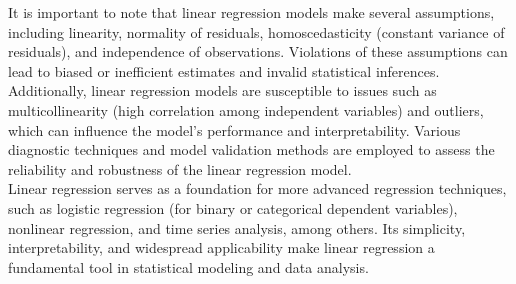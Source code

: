 It is important to note that linear regression models make several assumptions, including linearity, normality of residuals, homoscedasticity (constant variance of residuals), and independence of observations. Violations of these assumptions can lead to biased or inefficient estimates and invalid statistical inferences.\\

Additionally, linear regression models are susceptible to issues such as multicollinearity (high correlation among independent variables) and outliers, which can influence the model's performance and interpretability. Various diagnostic techniques and model validation methods are employed to assess the reliability and robustness of the linear regression model.\\

Linear regression serves as a foundation for more advanced regression techniques, such as logistic regression (for binary or categorical dependent variables), nonlinear regression, and time series analysis, among others. Its simplicity, interpretability, and widespread applicability make linear regression a fundamental tool in statistical modeling and data analysis.

\newpage